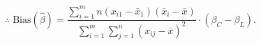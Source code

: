 \documentclass[11pt, a4paper]{article}
\begin{document}
\begin{align*}
\therefore \; \text{Bias}(\widehat{\beta}) = \dfrac{\sum \limits_{i=1}^{m} n (x_{i1} - \bar{x}_1)(\bar{x}_i - \bar{x})}{\sum \limits_{i=1}^{m} \sum \limits_{j=1}^{n} (x_{ij} - \bar{x})^2} \cdot (\beta_C - \beta_L).
\end{align*}



\vspace{5em}

\begin{center}
\BlackRookOnBlack \BlackKnightOnWhite \BlackBishopOnBlack \BlackKingOnWhite \BlackQueenOnBlack \BlackBishopOnWhite \BlackKnightOnBlack \BlackRookOnWhite
\end{center}
\end{document}
